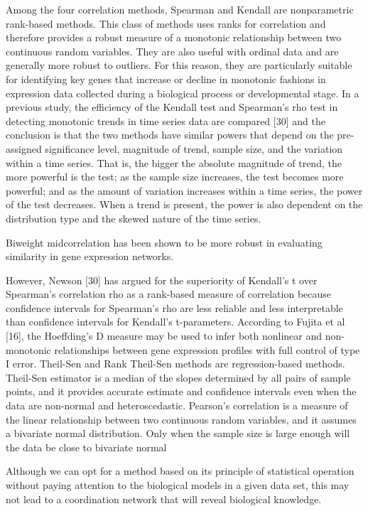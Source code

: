 Among the four correlation methods, Spearman and Kendall are nonparametric rank-based methods. This class of methods uses ranks for correlation and therefore provides a robust measure of a monotonic relationship between two continuous random variables. They are also useful with ordinal data and are generally more robust to outliers. For this reason, they are particularly suitable for identifying key genes that increase or decline in monotonic fashions in expression data collected during a biological process or developmental stage. In a previous study, the efficiency of the Kendall test and Spearman’s rho test in detecting monotonic trends in time series data are compared [30] and the conclusion is that the two methods have similar powers that depend on the pre-assigned significance level, magnitude of trend, sample size, and the variation within a time series. That is, the bigger the absolute magnitude of trend, the more powerful is the test; as the sample size increases, the test becomes more powerful; and as the amount of variation increases within a time series, the power of the test decreases. When a trend is present, the power is also dependent on the distribution type and the skewed nature of the time series. 

Biweight midcorrelation has been shown to be more robust in evaluating similarity in gene expression networks.

However, Newson [30] has argued for the superiority of Kendall’s t over Spearman’s correlation rho as a rank-based measure of correlation because confidence intervals for Spearman’s rho are less reliable and less interpretable than confidence intervals for Kendall’s t-parameters. According to Fujita et al [16], the Hoeffding’s D measure may be used to infer both nonlinear and non-monotonic relationships between gene expression profiles with full control of type I error. Theil-Sen and Rank Theil-Sen methods are regression-based methods. Theil-Sen estimator is a median of the slopes determined by all pairs of sample points, and it provides accurate estimate and confidence intervals even when the data are non-normal and heteroscedastic. Pearson’s correlation is a measure of the linear relationship between two continuous random variables, and it assumes a bivariate normal distribution. Only when the sample size is large enough will the data be close to bivariate normal

Although we can opt for a method based on its principle of statistical operation without paying attention to the biological models in a given data set, this may not lead to a coordination network that will reveal biological knowledge. 

